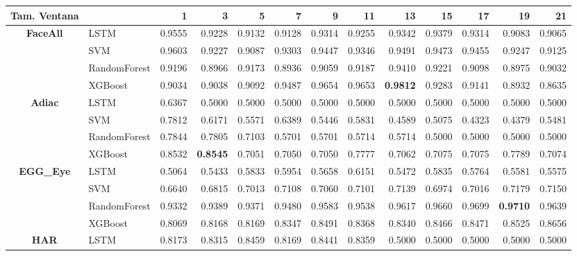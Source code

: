 \begin{table}[h]
\centering
\begin{adjustbox}{max width=15cm}
\begin{tabular}{|c|l|r|r|r|r|r|r|r|r|r|r|r|}
	\hline
	\textbf{Tam. Ventana}&         &      1  &      3  &      5  &      7  &      9  &      11 &      13 &      15 &      17 &      19 &      21 \\
	\hline
	\textbf{FaceAll} & LSTM &  0.9555 &  0.9228 &  0.9132 &  0.9128 &  0.9314 &  0.9255 &  0.9342 &  0.9379 &  0.9314 &  0.9083 &  0.9065 \\
	& SVM &  0.9603 &  0.9227 &  0.9087 &  0.9303 &  0.9447 &  0.9346 &  0.9491 &  0.9473 &  0.9455 &  0.9247 &  0.9125 \\
	& RandomForest &  0.9196 &  0.8966 &  0.9173 &  0.8936 &  0.9059 &  0.9187 &  0.9410 &  0.9221 &  0.9098 &  0.8975 &  0.9032 \\
	& XGBoost &  0.9034 &  0.9038 &  0.9092 &  0.9487 &  0.9654 &  0.9653 &  \textbf{0.9812} &  0.9283 &  0.9141 &  0.8932 &  0.8635 \\
	\hline
	\textbf{Adiac} & LSTM &  0.6367 &  0.5000 &  0.5000 &  0.5000 &  0.5000 &  0.5000 &  0.5000 &  0.5000 &  0.5000 &  0.5000 &  0.5000 \\
	& SVM &  0.7812 &  0.6171 &  0.5571 &  0.6389 &  0.5446 &  0.5831 &  0.4589 &  0.5075 &  0.4323 &  0.4379 &  0.5481 \\
	& RandomForest &  0.7844 &  0.7805 &  0.7103 &  0.5701 &  0.5701 &  0.5714 &  0.5714 &  0.5000 &  0.5000 &  0.5000 &  0.5000 \\
	& XGBoost &  0.8532 &  \textbf{0.8545} &  0.7051 &  0.7050 &  0.7050 &  0.7777 &  0.7062 &  0.7075 &  0.7075 &  0.7789 &  0.7074 \\
	\hline
	\textbf{EGG\_Eye} & LSTM &  0.5064 &  0.5433 &  0.5833 &  0.5954 &  0.5658 &  0.6151 &  0.5472 &  0.5835 &  0.5764 &  0.5581 &  0.5575 \\
	& SVM &  0.6640 &  0.6815 &  0.7013 &  0.7108 &  0.7060 &  0.7101 &  0.7139 &  0.6974 &  0.7016 &  0.7179 &  0.7150 \\
	& RandomForest &  0.9332 &  0.9389 &  0.9371 &  0.9480 &  0.9583 &  0.9538 &  0.9617 &  0.9660 &  0.9699 &  \textbf{0.9710} &  0.9639 \\
	& XGBoost &  0.8069 &  0.8168 &  0.8169 &  0.8347 &  0.8491 &  0.8368 &  0.8340 &  0.8466 &  0.8471 &  0.8525 &  0.8656 \\
	\hline
	\textbf{HAR} & LSTM &  0.8173 &  0.8315 &  0.8459 &  0.8169 &  0.8441 &  0.8359 &  0.5000 &  0.5000 &  0.5000 &  0.5000 &  0.5000 \\

\end{tabular}
\end{adjustbox}
\end{table}
